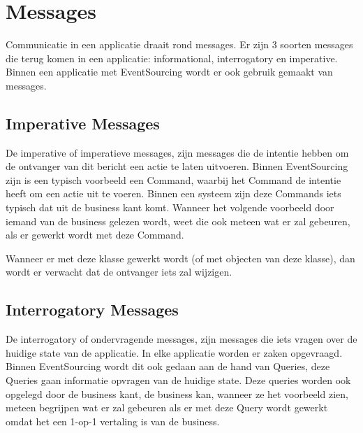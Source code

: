 
\section{Messages}
\label{sec:messages}

Communicatie in een applicatie draait rond messages. Er zijn 3 soorten messages die terug komen in een applicatie: informational, interrogatory en imperative. \textcite{Verraes2015Messages}
Binnen een applicatie met EventSourcing wordt er ook gebruik gemaakt van messages.

\subsection{Imperative Messages}
\label{subsec:imperative-messages}

De imperative of imperatieve messages, zijn messages die de intentie hebben om de ontvanger van dit bericht een actie te laten uitvoeren.
Binnen EventSourcing zijn is een typisch voorbeeld een Command, waarbij het Command de intentie heeft om een actie uit te voeren. Binnen een systeem zijn deze Commands iets typisch dat uit de business kant komt. Wanneer het volgende voorbeeld door iemand van de business gelezen wordt, weet die ook meteen wat er zal gebeuren, als er gewerkt wordt met deze Command.


Wanneer er met deze klasse gewerkt wordt (of met objecten van deze klasse), dan wordt er verwacht dat de ontvanger iets zal wijzigen.

\subsection{Interrogatory Messages}
\label{subsec:interrogatory-messages}

De interrogatory of ondervragende messages, zijn messages die iets vragen over de huidige state van de applicatie. In elke applicatie worden er zaken opgevraagd. Binnen EventSourcing wordt dit ook gedaan aan de hand van Queries, deze Queries gaan informatie opvragen van de huidige state. Deze queries worden ook opgelegd door de business kant, de business kan, wanneer ze het voorbeeld zien, meteen begrijpen wat er zal gebeuren als er met deze Query wordt gewerkt omdat het een 1-op-1 vertaling is van de business.

